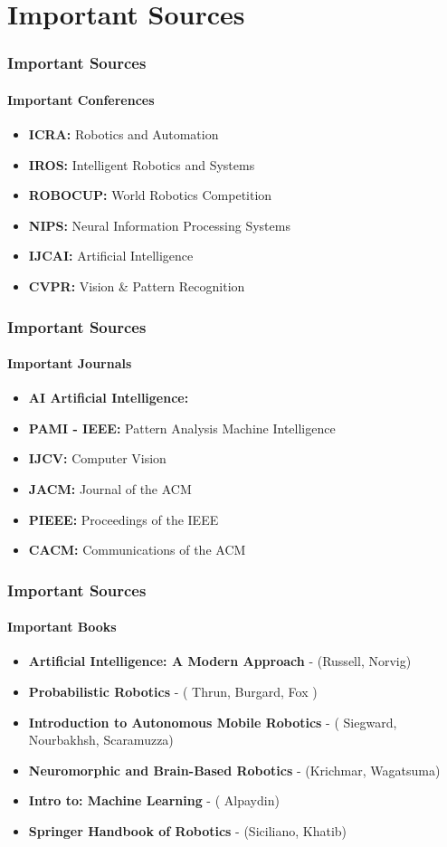 \section{Important Sources}

\begin{frame}
    \frametitle{Important Sources}
    \framesubtitle{Important Conferences}
    \begin{itemize}
        \item \textbf{ICRA:} Robotics and Automation
        \item \textbf{IROS:} Intelligent Robotics and Systems
        \item \textbf{ROBOCUP:} World Robotics Competition
        \item \textbf{NIPS:} Neural Information Processing Systems
        \item \textbf{IJCAI:} Artificial Intelligence
        \item \textbf{CVPR:} Vision \& Pattern Recognition
    \end{itemize}
\end{frame}

\begin{frame}
    \frametitle{Important Sources}
    \framesubtitle{Important Journals}
    \begin{itemize}
		\item \textbf{AI Artificial Intelligence:}
        \item \textbf{PAMI - IEEE:} Pattern Analysis Machine Intelligence
        \item \textbf{IJCV:} Computer Vision        
        \item \textbf{JACM:} Journal of the ACM
        \item \textbf{PIEEE:} Proceedings of the IEEE
        \item \textbf{CACM:} Communications of the ACM
    \end{itemize}
\end{frame}


\begin{frame}
    \frametitle{Important Sources}
    \framesubtitle{Important Books}
    \begin{itemize}
		\item \textbf{Artificial Intelligence: A Modern Approach}  - (Russell, Norvig)
		\item \textbf{Probabilistic Robotics} - ( Thrun, Burgard, Fox )
		\item \textbf{Introduction to Autonomous Mobile Robotics} - ( Siegward, Nourbakhsh, Scaramuzza)
		\item \textbf{Neuromorphic and Brain-Based Robotics} - (Krichmar, Wagatsuma)
		\item \textbf{Intro to: Machine Learning} - ( Alpaydin)
		\item \textbf{Springer Handbook of Robotics} - (Siciliano, Khatib)
		
	\end{itemize}
\end{frame}

